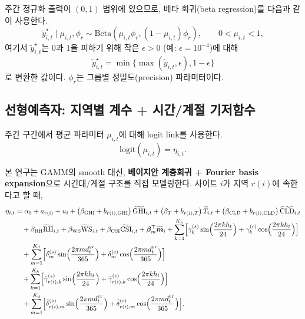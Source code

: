 \documentclass[11pt,a4paper]{article}
\begin{document}
주간 정규화 출력이 $(0,1)$ 범위에 있으므로, 베타 회귀(beta regression)를 다음과 같이 사용한다.
\begin{equation}
    \tilde y^{\star}_{i,t} \mid \mu_{i,t},\phi_r \sim \mathrm{Beta}(\mu_{i,t}\phi_r, (1-\mu_{i,t})\phi_r),
    \qquad 0<\mu_{i,t}<1,
    \label{eq:beta_obs}
\end{equation}
여기서 $\tilde y^{\star}_{i,t}$는 $0$과 $1$을 피하기 위해 작은 $\epsilon>0$ (예: $\epsilon=10^{-4}$)에 대해
\begin{equation}
    \tilde y^{\star}_{i,t}=\min\{\max(\tilde y_{i,t},\epsilon),1-\epsilon\}
\end{equation}
로 변환한 값이다. $\phi_r$는 그룹별 정밀도(precision) 파라미터이다.

\subsection{선형예측자: 지역별 계수 + 시간/계절 기저함수}
주간 구간에서 평균 파라미터 $\mu_{i,t}$에 대해 logit link를 사용한다.
\begin{equation}
    \mathrm{logit}(\mu_{i,t}) = \eta_{i,t}.
\end{equation}

본 연구는 GAMM의 smooth 대신, \textbf{베이지안 계층회귀 + Fourier basis expansion}으로 시간대/계절 구조를 직접 모델링한다. 사이트 $i$가 지역 $r(i)$에 속한다고 할 때,
\begin{align}
    \eta_{i,t}
    &= \alpha_0 + a_{r(i)} + u_i
    + \bigl(\beta_{\mathrm{GHI}} + b_{r(i),\mathrm{GHI}}\bigr)\,\widetilde{\mathrm{GHI}}_{i,t}
    + \bigl(\beta_T + b_{r(i),T}\bigr)\,\widetilde T_{i,t}
    + \bigl(\beta_{\mathrm{CLD}} + b_{r(i),\mathrm{CLD}}\bigr)\,\widetilde{\mathrm{CLD}}_{i,t} \\
    &\quad + \beta_{\mathrm{RH}}\widetilde{\mathrm{RH}}_{i,t}
    + \beta_{\mathrm{WS}}\widetilde{\mathrm{WS}}_{i,t}
    + \beta_{\mathrm{CSI}}\widetilde{\mathrm{CSI}}_{i,t}
    + \bm \beta_m^\top \widetilde{\bm m}_i
    + \sum_{k=1}^{K_h}
    \Bigl[\gamma_k^{(s)} \sin\Bigl(\frac{2\pi k h_t}{24}\Bigr)
    + \gamma_k^{(c)} \cos\Bigl(\frac{2\pi k h_t}{24}\Bigr)\Bigr] \\
    &\quad + \sum_{m=1}^{K_d}
    \Bigl[\delta_m^{(s)} \sin\Bigl(\frac{2\pi m d_t^{\mathrm{yr}}}{365}\Bigr)
    + \delta_m^{(c)} \cos\Bigl(\frac{2\pi m d_t^{\mathrm{yr}}}{365}\Bigr)\Bigr] \\
    &\quad + \sum_{k=1}^{K_h}
    \Bigl[\tilde\gamma_{r(i),k}^{(s)} \sin\Bigl(\frac{2\pi k h_t}{24}\Bigr)
    + \tilde\gamma_{r(i),k}^{(c)} \cos\Bigl(\frac{2\pi k h_t}{24}\Bigr)\Bigr] \\
    &\quad + \sum_{m=1}^{K_d}
    \Bigl[\tilde\delta_{r(i),m}^{(s)} \sin\Bigl(\frac{2\pi m d_t^{\mathrm{yr}}}{365}\Bigr)
    + \tilde\delta_{r(i),m}^{(c)} \cos\Bigl(\frac{2\pi m d_t^{\mathrm{yr}}}{365}\Bigr)\Bigr].
    \label{eq:bayes_stage1}
\end{align}
\end{document}
